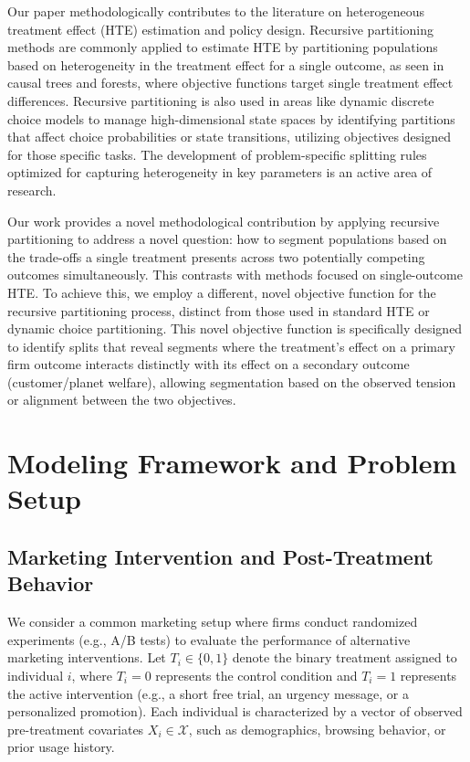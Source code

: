 \documentclass[11pt,letterpaper,english]{article}
\theoremstyle{definition}
\theoremstyle{definition}
\begin{document}
\begin{bibunit}
Our paper methodologically contributes to the literature on heterogeneous treatment effect (HTE) estimation and policy design. Recursive partitioning methods are commonly applied to estimate HTE by partitioning populations based on heterogeneity in the treatment effect for a single outcome, as seen in causal trees and forests, where objective functions target single treatment effect differences. Recursive partitioning is also used in areas like dynamic discrete choice models to manage high-dimensional state spaces by identifying partitions that affect choice probabilities or state transitions, utilizing objectives designed for those specific tasks. The development of problem-specific splitting rules optimized for capturing heterogeneity in key parameters is an active area of research.

Our work provides a novel methodological contribution by applying recursive partitioning to address a novel question: how to segment populations based on the trade-offs a single treatment presents across two potentially competing outcomes simultaneously. This contrasts with methods focused on single-outcome HTE. To achieve this, we employ a different, novel objective function for the recursive partitioning process, distinct from those used in standard HTE or dynamic choice partitioning. This novel objective function is specifically designed to identify splits that reveal segments where the treatment's effect on a primary firm outcome interacts distinctly with its effect on a secondary outcome (customer/planet welfare), allowing segmentation based on the observed tension or alignment between the two objectives. 


\section{Modeling Framework and Problem Setup}
\label{sec:app}
\subsection{Marketing Intervention and Post-Treatment Behavior}

We consider a common marketing setup where firms conduct randomized experiments (e.g., A/B tests) to evaluate the performance of alternative marketing interventions. Let $T_i \in \{0, 1\}$ denote the binary treatment assigned to individual $i$, where $T_i = 0$ represents the control condition and $T_i = 1$ represents the active intervention (e.g., a short free trial, an urgency message, or a personalized promotion). Each individual is characterized by a vector of observed pre-treatment covariates $X_i \in \mathcal{X}$, such as demographics, browsing behavior, or prior usage history.


\end{bibunit}
\end{document}
